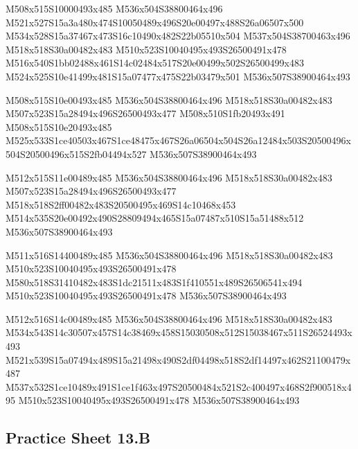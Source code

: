 \documentclass{article}
\begin{document}
\begin{multicols}{5}
\begin{center}

M508x515S10000493x485 %
M536x504S38800464x496 %
M521x527S15a3a480x474S10050489x496S20e00497x488S26a06507x500 %
M534x528S15a37467x473S16c10490x482S22b05510x504 %
M537x504S38700463x496 %
M518x518S30a00482x483 %
M510x523S10040495x493S26500491x478 %
M516x540S1bb02488x461S14c02484x517S20e00499x502S26500499x483 %
M524x525S10e41499x481S15a07477x475S22b03479x501 %
M536x507S38900464x493 %
\vfil
\columnbreak

M508x515S10e00493x485 %
M536x504S38800464x496 %
M518x518S30a00482x483 %
M507x523S15a28494x496S26500493x477 %
M508x510S1fb20493x491 %
M508x515S10e20493x485 %
M525x533S1ce40503x467S1ce48475x467S26a06504x504S26a12484x503S20500496x504S20500496x515S2fb04494x527 %
M536x507S38900464x493 %
\vfil
\columnbreak

M512x515S11e00489x485 %
M536x504S38800464x496 %
M518x518S30a00482x483 %
M507x523S15a28494x496S26500493x477 %
M518x518S2ff00482x483S20500495x469S14c10468x453 %
M514x535S20e00492x490S28809494x465S15a07487x510S15a51488x512 %
M536x507S38900464x493 %
\vfil
\columnbreak

M511x516S14400489x485 %
M536x504S38800464x496 %
M518x518S30a00482x483 %
M510x523S10040495x493S26500491x478 %
M580x518S31410482x483S1dc21511x483S1f410551x489S26506541x494 %
M510x523S10040495x493S26500491x478 %
M536x507S38900464x493 %
\vfil
\columnbreak

M512x516S14c00489x485 %
M536x504S38800464x496 %
M518x518S30a00482x483 %
M534x543S14c30507x457S14c38469x458S15030508x512S15038467x511S26524493x493 %
M521x539S15a07494x489S15a21498x490S2df04498x518S2df14497x462S21100479x487 %
M537x532S1ce10489x491S1ce1f463x497S20500484x521S2c400497x468S2f900518x495 %
M510x523S10040495x493S26500491x478 %
M536x507S38900464x493 %
\vfil

\end{center}
\end{multicols}

\subsection{Practice Sheet 13.B}
\end{document}

